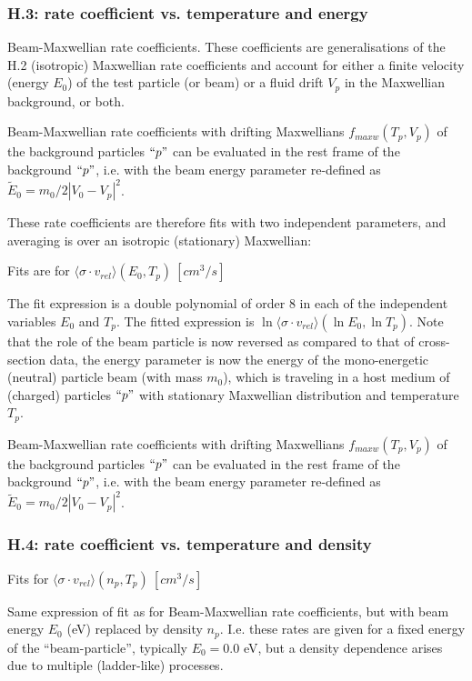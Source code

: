 \documentclass[12pt,dvips]{article}
\begin{document}
\subsubsection*{H.3: rate coefficient vs. temperature and energy}\label{sec1.3.3}
Beam-Maxwellian rate coefficients. These coefficients are generalisations of the H.2 (isotropic) Maxwellian rate coefficients and account for either
a finite velocity (energy $E_0$) of the  test particle (or beam) or a fluid drift $V_p$ in the Maxwellian background, or both.

Beam-Maxwellian rate coefficients with drifting Maxwellians $f_{maxw}(T_p,V_p)$ of the background particles $``p"$ can be evaluated in the
rest frame of the background $``p"$, i.e. with the beam energy parameter re-defined as $\widetilde{E}_0=m_0/2|V_0-V_p|^2$.

These rate coefficients are
therefore fits with two independent parameters, and averaging is over an isotropic (stationary) Maxwellian:

Fits are for $\langle\sigma \cdot v_{rel}  \rangle (E_0,T_p) \ [cm^3/s]$

The fit expression is a double polynomial of order 8  in each of the independent variables
$E_0$ and $T_p$. The fitted expression is $\ln\langle\sigma \cdot v_{rel}  \rangle (\ln{E_0},\ln{T_p})$.
Note that the role of the beam particle is now reversed as compared to that of cross-section data,
the energy parameter is now the energy of the mono-energetic (neutral) particle beam (with mass $m_0$), which is traveling in a host medium
of (charged) particles $``p"$ with stationary Maxwellian distribution and temperature $T_p$.

Beam-Maxwellian rate coefficients with drifting Maxwellians $f_{maxw}(T_p,V_p)$ of the background particles $``p"$ can be evaluated in the
rest frame of the background $``p"$, i.e. with the beam energy parameter re-defined as $\widetilde{E}_0=m_0/2|V_0-V_p|^2$.


\subsubsection*{H.4: rate coefficient vs. temperature and density}\label{sec1.3.4}
Fits for $\langle\sigma \cdot v_{rel}  \rangle (n_p,T_p) \ [cm^3/s]$

Same expression of fit as for Beam-Maxwellian rate coefficients, but with beam energy
$E_0$ (eV) replaced by density $n_p$.
I.e. these rates are given for a fixed energy of the ``beam-particle'', typically $E_0=0.0$ eV,
but a density dependence arises due to multiple (ladder-like) processes.
\end{document}
